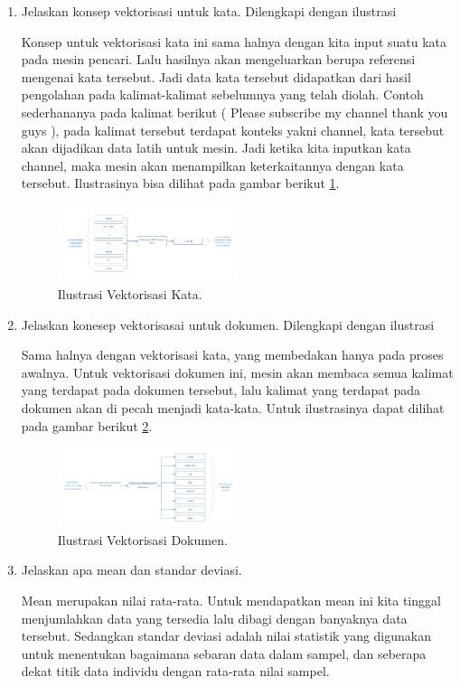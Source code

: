 \begin{enumerate}
\item Jelaskan konsep vektorisasi untuk kata. Dilengkapi dengan ilustrasi \par
Konsep untuk vektorisasi kata ini sama halnya dengan kita input suatu kata pada mesin pencari. Lalu hasilnya akan mengeluarkan berupa referensi mengenai kata tersebut. Jadi data kata tersebut didapatkan dari hasil pengolahan pada kalimat-kalimat sebelumnya yang telah diolah. Contoh sederhananya pada kalimat berikut ( Please subscribe my channel thank you guys ), pada kalimat tersebut terdapat konteks yakni channel, kata tersebut akan dijadikan data latih untuk mesin. Jadi ketika kita inputkan kata channel, maka mesin akan menampilkan keterkaitannya dengan kata tersebut. Ilustrasinya bisa dilihat pada gambar berikut \ref{vek3}.
		\begin{figure}[!htbp]
		\centerline{\includegraphics[width=0.5\textwidth]{figures/im/vek3.png}}
		\caption{Ilustrasi Vektorisasi Kata.}
		\label{vek3}
		\end{figure}

\item Jelaskan konesep vektorisasai untuk dokumen. Dilengkapi dengan ilustrasi \par
Sama halnya dengan vektorisasi kata, yang membedakan hanya pada proses awalnya. Untuk vektorisasi dokumen ini, mesin akan membaca semua kalimat yang terdapat pada dokumen tersebut, lalu kalimat yang terdapat pada dokumen akan di pecah menjadi kata-kata. Untuk ilustrasinya dapat dilihat pada gambar berikut \ref{vek4}.
		\begin{figure}[!htbp]
		\centerline{\includegraphics[width=0.5\textwidth]{figures/im/vek4.png}}
		\caption{Ilustrasi Vektorisasi Dokumen.}
		\label{vek4}
		\end{figure}

\item Jelaskan apa mean dan standar deviasi. \par
Mean merupakan nilai rata-rata. Untuk mendapatkan mean ini kita tinggal menjumlahkan data yang tersedia lalu dibagi dengan banyaknya data tersebut. Sedangkan standar deviasi adalah nilai statistik yang digunakan untuk menentukan bagaimana sebaran data dalam sampel, dan seberapa dekat titik data individu dengan rata-rata nilai sampel.


\end{enumerate}
